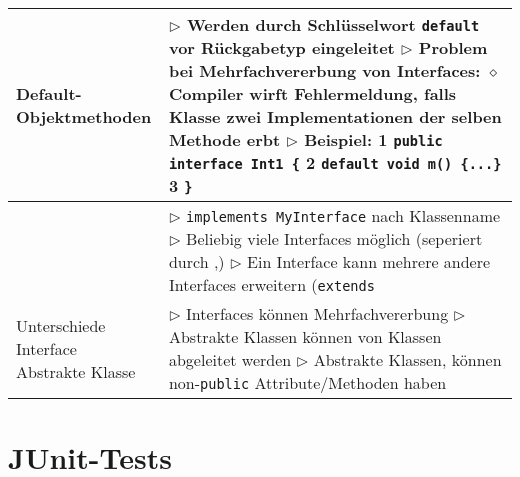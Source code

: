 \begin{tabular}{ | p{} p{} | }
    \makecell[l]{Default-\\Objektmethoden} & \makecell[l]{
    $\triangleright$ Werden durch Schlüsselwort \texttt{default} vor Rückgabetyp eingeleitet \\
    $\triangleright$ Problem bei Mehrfachvererbung von Interfaces: \\
    \hspace{0.4cm} $\diamond$ Compiler wirft Fehlermeldung, falls Klasse zwei Implementationen  \\
    \hspace{0.8cm} der selben Methode erbt \\
    $\triangleright$ Beispiel: \\
    \hspace{0.4cm} 1 \hspace{0.1cm} \texttt{public interface Int1 \{} \\
    \hspace{0.4cm} 2 \hspace{0.5cm} \texttt{default void m() \{...\}} \\
    \hspace{0.4cm} 3 \hspace{0.1cm} \texttt{\}}} \\ \hline

	\makecell[l]{Verwendung} & \makecell[l]{
	$\triangleright$ \texttt{implements MyInterface} nach Klassenname  \\
	$\triangleright$ Beliebig viele Interfaces möglich (seperiert durch ,) \\
    $\triangleright$ Ein Interface kann mehrere andere Interfaces erweitern (\texttt{extends}} \\ \hline


    \makecell[l]{Unterschiede Interface \\ Abstrakte Klasse} & \makecell[l]{
    $\triangleright$ Interfaces können Mehrfachvererbung \\
    $\triangleright$ Abstrakte Klassen können von Klassen abgeleitet werden \\
    $\triangleright$ Abstrakte Klassen, können non-\texttt{public} Attribute/Methoden haben} \\ \hline
    

	\end{tabular}

\section{JUnit-Tests}

